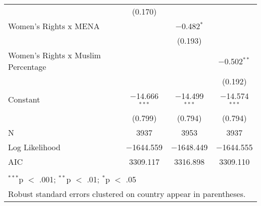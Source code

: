 \begin{table}[!htbp]
\begin{tabular}{@{\extracolsep{5pt}}lccc}
  & (0.170) &  &  \\ 
  Women's Rights x MENA &  & $-$0.482$^{*}$ &  \\ 
  &  & (0.193) &  \\ 
  Women's Rights x Muslim Percentage &  &  & $-$0.502$^{**}$ \\ 
  &  &  & (0.192) \\ 
  Constant & $-$14.666$^{***}$ & $-$14.499$^{***}$ & $-$14.574$^{***}$ \\ 
  & (0.799) & (0.794) & (0.794) \\ 
 N & 3937 & 3953 & 3937 \\ 
Log Likelihood & $-$1644.559 & $-$1648.449 & $-$1644.555 \\ 
AIC & 3309.117 & 3316.898 & 3309.110 \\ 
\hline \\[-1.8ex] 
\multicolumn{4}{l}{$^{***}$p $<$ .001; $^{**}$p $<$ .01; $^{*}$p $<$ .05} \\ 
\multicolumn{4}{l}{Robust standard errors clustered on country appear in parentheses.} \\ 
\end{tabular} 
\end{table} 
